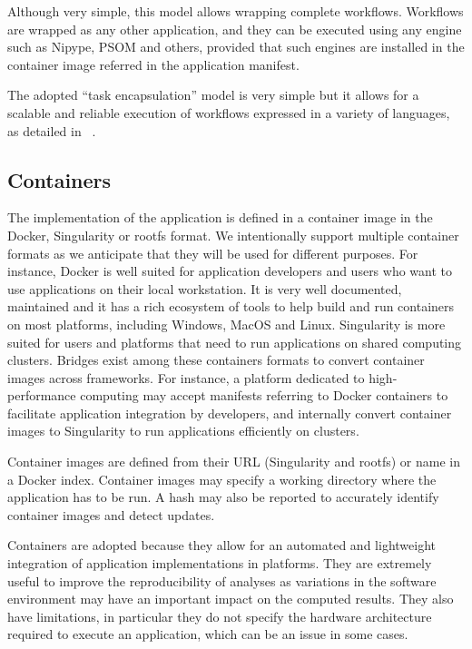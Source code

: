 \documentclass{article}
\begin{document}
Although very simple, this model allows wrapping complete
workflows. Workflows are wrapped as any other application, and they
can be executed using any engine such as Nipype, PSOM and others,
provided that such engines are installed in the container image
referred in the application manifest. 

The adopted ``task encapsulation'' model is very simple but it
allows for a scalable and reliable execution of workflows expressed in
a variety of languages, as detailed in ~\cite{glatard2016fgcs}.

\subsection{Containers}

The implementation of the application is defined in a container image
in the Docker, Singularity or rootfs format. We intentionally support
multiple container formats as we anticipate that they will be used for
different purposes. For instance, Docker is well suited for
application developers and users who want to use applications on their
local workstation. It is very well documented, maintained and it has a
rich ecosystem of tools to help build and run containers on most
platforms, including Windows, MacOS and Linux. Singularity is more
suited for users and platforms that need to run applications on shared
computing clusters. Bridges exist among these containers formats to
convert container images across frameworks. For instance, a platform
dedicated to high-performance computing may accept manifests referring
to Docker containers to facilitate application integration by
developers, and internally convert container images to Singularity to
run applications efficiently on clusters.

Container images are defined from their URL (Singularity and rootfs)
or name in a Docker index. Container images may specify a working
directory where the application has to be run. A hash may also be
reported to accurately identify container images and detect updates.

Containers are adopted because they allow for an automated and
lightweight integration of application implementations in
platforms. They are extremely useful to improve the reproducibility of
analyses as variations in the software environment may have an
important impact on the computed results. They also have limitations,
in particular they do not specify the hardware architecture required
to execute an application, which can be an issue in some cases.
\end{document}
